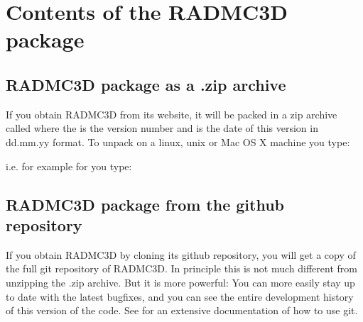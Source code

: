 \documentclass[letterpaper,10pt,english]{sphinxmanual}
\begin{document}
\section{Contents of the RADMC\sphinxhyphen{}3D package}
\label{\detokenize{overview:contents-of-the-radmc-3d-package}}

\subsection{RADMC\sphinxhyphen{}3D package as a .zip archive}
\label{\detokenize{overview:radmc-3d-package-as-a-zip-archive}}
If you obtain RADMC\sphinxhyphen{}3D from its website, it will be
packed in a zip archive called
 where the  is the version
number and  is the date of this version in dd.mm.yy
format. To unpack on a linux, unix or Mac OS X machine you type:

\begin{sphinxVerbatim}[commandchars=\\\{\}]
   
\end{sphinxVerbatim}

i.e. for example for  you type:

\begin{sphinxVerbatim}[commandchars=\\\{\}]
 
\end{sphinxVerbatim}


\subsection{RADMC\sphinxhyphen{}3D package from the github repository}
\label{\detokenize{overview:radmc-3d-package-from-the-github-repository}}
If you obtain RADMC\sphinxhyphen{}3D by cloning its github repository, you will get
a copy of the full git repository of RADMC\sphinxhyphen{}3D. In principle this is
not much different from unzipping the .zip archive. But it is more
powerful: You can more easily stay up to date with the latest bugfixes,
and you can see the entire development history of this version of the
code. See  for an extensive documentation
of how to use git.
\end{document}
